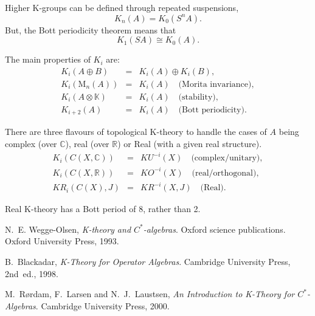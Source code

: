 \documentclass[12pt]{article}
\newcommand*{\Rset}{\mathbb{R}}
\newcommand*{\Cset}{\mathbb{C}}
\newcommand*{\Kset}{\mathbb{K}}
\newcommand*{\Matrix}[2]{\mathord{\mathrm{M}_{#1}(#2)}}
\theoremstyle{inlinedefn}
\theoremstyle{break}
\begin{document}
Higher K-groups can be defined through repeated suspensions,
\begin{equation}
K_n(A) = K_0(S^n A).
\end{equation}
But, the Bott periodicity theorem means that
\begin{equation}
K_1(SA) \cong K_0(A).
\end{equation}

The main properties of $K_i$ are:
\begin{eqnarray}
K_i(A \oplus B) & = & K_i(A) \oplus K_i(B), \\
K_i(\Matrix{n}{A}) & = & K_i(A) \quad\mbox{(Morita invariance)}, \\
K_i(A \otimes \Kset) & = & K_i(A) \quad\mbox{(stability)}, \\
K_{i+2}(A) & = & K_i(A) \quad\mbox{(Bott periodicity)}.
\end{eqnarray}

There are three flavours of topological K-theory to handle the cases
of $A$ being complex (over $\Cset$), real (over $\Rset$) or Real
(with a given real structure).
\begin{eqnarray}
K_i(C(X,\Cset)) & = & \mathit{KU}^{-i}(X) \quad\mbox{(complex/unitary)}, \\
K_i(C(X,\Rset)) & = & \mathit{KO}^{-i}(X) \quad\mbox{(real/orthogonal)}, \\
\mathit{KR}_i(C(X),J) & = & \mathit{KR}^{-i}(X,J) \quad\mbox{(Real)}.
\end{eqnarray}

Real K-theory has a Bott period of 8, rather than 2.

\begin{thebibliography}{10}
N.~E. Wegge-Olsen, {\em K-theory and $C^*$-algebras}.
\newblock Oxford science publications. Oxford University Press, 1993.

B.~Blackadar, {\em K-Theory for Operator Algebras}.
\newblock Cambridge University Press, 2nd~ed., 1998.

M.~R{\o}rdam, F.~Larsen and N.~J.~Laustsen, {\em An Introduction to K-Theory for $C^*$-Algebras}.
\newblock Cambridge University Press, 2000.
\end{thebibliography}
\end{document}
